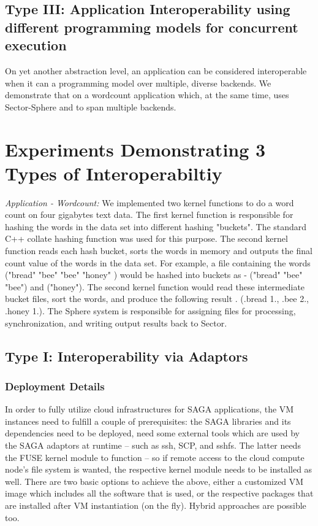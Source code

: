 \documentclass[3p,twocolumn]{elsarticle}
\begin{document}
\subsection{Type III: Application Interoperability using different
  programming models for concurrent execution}


On yet another abstraction level, an application can be considered
interoperable when it can  a programming model over
multiple, diverse backends.  We demonstrate that on a wordcount
application which, at the same time, uses Sector-Sphere \MR and \smr
to span multiple backends.
            

\section{Experiments Demonstrating 3 Types of Interoperabiltiy}
\label{sec:exp}

{\it Application - Wordcount: } We implemented two kernel functions to
do a word count on four gigabytes text data.  The first kernel
function is responsible for hashing the words in the data set into
different hashing "buckets". The standard C++ collate hashing function
was used for this purpose. The second kernel function reads each hash
bucket, sorts the words in memory and outputs the final count value of
the words in the data set.  For example, a file containing the words
("bread" "bee" "bee" "honey" ) would be hashed into buckets as -
("bread" "bee" "bee") and ("honey").  The second kernel function would
read these intermediate bucket files, sort the words, and produce the
following result . (.bread 1., .bee 2., .honey 1.).  The Sphere system
is responsible for assigning files for processing, synchronization,
and writing output results back to Sector.

\subsection{Type I: Interoperability via Adaptors}

\subsubsection{Deployment Details}

In order to fully utilize cloud infrastructures for SAGA applications,
the VM instances need to fulfill a couple of prerequisites: the SAGA
libraries and its dependencies need to be deployed, need some external
tools which are used by the SAGA adaptors at runtime -- such as ssh,
SCP, and sshfs.  The latter needs the FUSE kernel module to function
-- so if remote access to the cloud compute node's file system is
wanted, the respective kernel module needs to be installed as well.
There are two basic options to achieve the above, either a customized
VM image which includes all the software that is used, or the
respective packages that are installed after VM instantiation (on the
fly).  Hybrid approaches are possible too.
\end{document}
